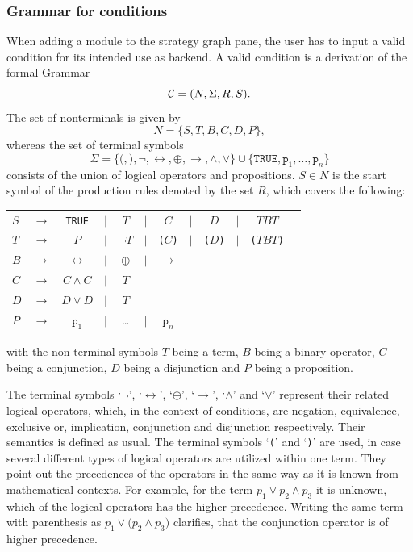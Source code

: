 \subsubsection{Grammar for conditions}
\label{sec:grammar_for_backend_conditions}
When adding a module to the strategy graph pane, the user has to input a valid
condition for its intended use as backend. A valid condition is a derivation of 
the formal Grammar 
\[{\cal C}=(N, \Sigma, R, S).\] 
The set of nonterminals is given by 
\[N=\{S, T, B, C, D, P\},\] 
whereas the set of terminal symbols 
\[\Sigma=\{\texttt{(}, \texttt{)}, \neg, \leftrightarrow, \oplus, \rightarrow, \land, \lor\} \cup \{\texttt{TRUE}, \texttt{p}_1, \dots, \texttt{p}_n \}\]
consists of the union of logical operators and propositions. $S \in N$ is the 
start symbol of the production rules denoted by the set $R$, which covers the following:
\begin{center}
\begin{tabular}{lccccccccccc}
  $S$ & $\rightarrow$ & \texttt{TRUE} & $|$ & $T$ & $|$ & $C$ & $|$ & $D$ & $|$ & $TBT$ \\
  $T$ & $\rightarrow$ & $P$ & $|$ & $\neg T$ & $|$ & \texttt{(}$C$\texttt{)} & $|$ & \texttt{(}$D$\texttt{)} & $|$ & \texttt{(}$TBT$\texttt{)} \\
  $B$ & $\rightarrow$ & $\leftrightarrow$ & $|$ & $\oplus$ & $|$ & $\rightarrow$ \\
  $C$ & $\rightarrow$ & $C\land C$ & $|$ & $T$ \\
  $D$ & $\rightarrow$ & $D\lor D$ & $|$ & $T$ \\
  $P$ & $\rightarrow$ & $\texttt{p}_1$ & $|$ & \dots & $|$ & $\texttt{p}_n$ \\
\end{tabular}
\end{center}

with the non-terminal symbols $T$ being a term, $B$ being a binary operator, 
$C$ being a conjunction, $D$ being a disjunction and $P$ being a proposition.

The terminal symbols `$\neg$', `$\leftrightarrow$', `$\oplus$', `$\rightarrow$',
`$\land$' and `$\lor$' represent their related logical operators, which, in 
the context of conditions, are negation, equivalence, exclusive or, implication,
conjunction and disjunction respectively. Their semantics is defined as usual.
The terminal symbols `\texttt{(}' and `\texttt{)}' are used, in case several 
different types of logical operators are utilized within one term. They point
out the precedences of the operators in the same way as it is known from 
mathematical contexts. For example, for the term $p_1 \lor p_2 \land p_3$ it 
is unknown, which of the logical operators has the higher precedence. Writing 
the same term with parenthesis as $p_1 \lor (p_2 \land p_3 \texttt{)}$ clarifies, 
that the conjunction operator is of higher precedence.

